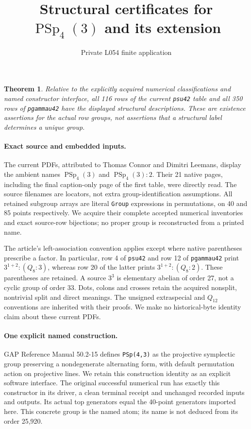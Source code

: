 \documentclass[11pt]{article}
\title{Structural certificates for $\operatorname{PSp}_4(3)$ and its extension}
\author{Private L054 finite application}\date{}
\newtheorem{theorem}{Theorem}
\begin{document}
\maketitle
\begin{theorem}
Relative to the explicitly acquired numerical classifications and named
constructor interface, all 116 rows of the current \texttt{psu42} table
and all 350 rows of \texttt{pgammau42} have the displayed structural
descriptions. These are existence assertions for the actual row groups,
not assertions that a structural label determines a unique group.
\end{theorem}

\paragraph{Exact source and embedded inputs.}
The current PDFs, attributed to Thomas Connor and Dimitri Leemans, display
the ambient names $\operatorname{PSp}_4(3)$ and
$\operatorname{PSp}_4(3):2$. Their 21 native pages, including the final
caption-only page of the first table, were directly read. The source filenames
are locators, not extra group-identification assumptions. All retained
subgroup arrays are literal \texttt{Group} expressions in permutations,
on 40 and 85 points respectively. We acquire their complete accepted
numerical inventories and exact source-row bijections; no proper group is
reconstructed from a printed name.

The article's left-association convention applies except where native
parentheses prescribe a factor. In particular, row 4 of \texttt{psu42}
and row 12 of \texttt{pgammau42} print $3^{1+2}:(Q_8:3)$, whereas row 20
of the latter prints $3^{1+2}:(Q_8:2)$. These parentheses are retained.
A source $3^3$ is elementary abelian of order 27, not a cyclic group of
order 33. Dots, colons and crosses retain the acquired nonsplit, nontrivial
split and direct meanings. The unsigned extraspecial and $Q_{12}$
conventions are inherited with their proofs. We make no historical-byte
identity claim about these current PDFs.

\paragraph{One explicit named construction.}
GAP Reference Manual 50.2-15 defines \texttt{PSp(4,3)} as the projective
symplectic group preserving a nondegenerate alternating form, with default
permutation action on projective lines. We retain this construction identity
as an explicit software interface. The original successful numerical run
has exactly this constructor in its driver, a clean terminal receipt and
unchanged recorded inputs and outputs. Its actual top generators equal the
40-point generators imported here. This concrete group is the named atom;
its name is not deduced from its order 25,920.
\end{document}
